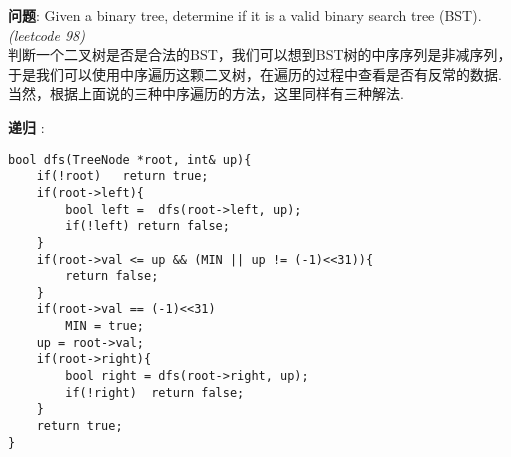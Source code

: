 \documentclass{article}
\begin{document}
\begin{CJK}{UTF8}{gbsn}     %

\else
	
\begin{description}
	\item{\textbf{问题}}: Given a binary tree, determine if it is a valid binary search tree (BST). \textit{(leetcode 98)}
	\\判断一个二叉树是否是合法的BST，我们可以想到BST树的中序序列是非减序列，于是我们可以使用中序遍历这颗二叉树，在遍历的过程中查看是否有反常的数据.
	\\当然，根据上面说的三种中序遍历的方法，这里同样有三种解法.
	\item{\textbf{递归}} : 
	\begin{lstlisting}
bool dfs(TreeNode *root, int& up){
	if(!root)	return true;
	if(root->left){
		bool left =  dfs(root->left, up);
		if(!left) return false;
	}
	if(root->val <= up && (MIN || up != (-1)<<31)){ 
	    return false;
	}	
    if(root->val == (-1)<<31)
		MIN = true;
	up = root->val;
	if(root->right){
		bool right = dfs(root->right, up);
		if(!right)	return false;
	}
	return true;
}


\end{lstlisting}
\end{description}
\end{CJK}
\end{document}
